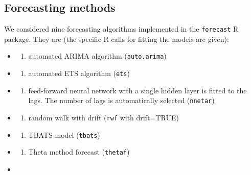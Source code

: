 \documentclass[11pt,a4paper,]{article}
\providecommand{\tightlist}{%
  \setlength{\itemsep}{0pt}\setlength{\parskip}{0pt}}
\theoremstyle{definition}
\theoremstyle{definition}
\theoremstyle{definition}
\theoremstyle{remark}
\begin{document}
\subsection{Forecasting methods}\label{forecasting-methods}

We considered nine forecasting algorithms implemented in the
\texttt{forecast} R package. They are (the specific R calls for fitting
the models are given):

\begin{itemize}
\item
  \begin{enumerate}
  \def\labelenumi{\roman{enumi})}
  \tightlist
  \item
    automated ARIMA algorithm (\texttt{auto.arima})
  \end{enumerate}
\item
  \begin{enumerate}
  \def\labelenumi{\roman{enumi})}
  \setcounter{enumi}{1}
  \tightlist
  \item
    automated ETS algorithm (\texttt{ets})
  \end{enumerate}
\item
  \begin{enumerate}
  \def\labelenumi{\roman{enumi})}
  \setcounter{enumi}{2}
  \tightlist
  \item
    feed-forward neural network with a single hidden layer is fitted to
    the lags. The number of lags is automatically selected
    (\texttt{nnetar})
  \end{enumerate}
\item
  \begin{enumerate}
  \def\labelenumi{\roman{enumi})}
  \setcounter{enumi}{3}
  \tightlist
  \item
    random walk with drift (\texttt{rwf} with drift=TRUE)
  \end{enumerate}
\item
  \begin{enumerate}
  \def\labelenumi{\alph{enumi})}
  \setcounter{enumi}{21}
  \tightlist
  \item
    TBATS model (\texttt{tbats})
  \end{enumerate}
\item
  \begin{enumerate}
  \def\labelenumi{\roman{enumi})}
  \setcounter{enumi}{5}
  \tightlist
  \item
    Theta method forecast (\texttt{thetaf})
  \end{enumerate}
\item

\end{itemize}
\end{document}
